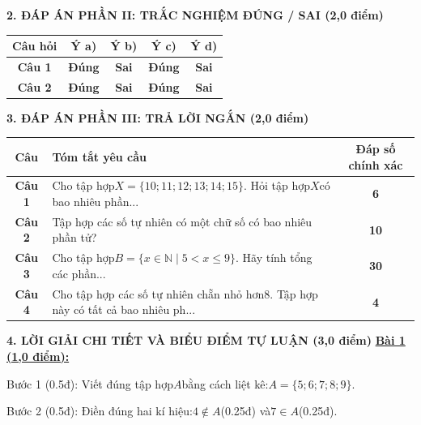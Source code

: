 \documentclass[11pt,a4paper]{article}
\begin{document}
\noindent\textbf{\large 2. ĐÁP ÁN PHẦN II: TRẮC NGHIỆM ĐÚNG / SAI (2,0 điểm)}
\vspace{4pt}
\begin{center}
\begin{tabular}{|c|c|c|c|c|}
\hline
\textbf{Câu hỏi} & \textbf{Ý a)} & \textbf{Ý b)} & \textbf{Ý c)} & \textbf{Ý d)} \\
\hline
\textbf{Câu 1} & \textbf{Đúng} & \textbf{Sai} & \textbf{Đúng} & \textbf{Sai} \\
\hline
\textbf{Câu 2} & \textbf{Đúng} & \textbf{Sai} & \textbf{Đúng} & \textbf{Sai} \\
\hline
\end{tabular}
\end{center}
\vspace{6pt}


\noindent\textbf{\large 3. ĐÁP ÁN PHẦN III: TRẢ LỜI NGẮN (2,0 điểm)}
\vspace{4pt}
\begin{center}
\begin{tabular}{|c|m{11cm}|c|}
\hline
\textbf{Câu} & \textbf{Tóm tắt yêu cầu} & \textbf{Đáp số chính xác} \\
\hline
\textbf{Câu 1} & Cho tập hợp$X = \{10; 11; 12; 13; 14; 15\}$. Hỏi tập hợp$X$có bao nhiêu phần... & \textbf{6} \\
\hline
\textbf{Câu 2} & Tập hợp các số tự nhiên có một chữ số có bao nhiêu phần tử? & \textbf{10} \\
\hline
\textbf{Câu 3} & Cho tập hợp$B = \{x \in \mathbb{N} \mid 5 < x \le 9\}$. Hãy tính tổng các phần... & \textbf{30} \\
\hline
\textbf{Câu 4} & Cho tập hợp các số tự nhiên chẵn nhỏ hơn$8$. Tập hợp này có tất cả bao nhiêu ph... & \textbf{4} \\
\hline
\end{tabular}
\end{center}
\vspace{6pt}


\noindent\textbf{\large 4. LỜI GIẢI CHI TIẾT VÀ BIỂU ĐIỂM TỰ LUẬN (3,0 điểm)}
\vspace{4pt}
\noindent\textbf{\underline{Bài 1 (1,0 điểm):}}\par\vspace{3pt}
Bước 1 (0.5đ): Viết đúng tập hợp$A$bằng cách liệt kê:$A = \{5; 6; 7; 8; 9\}$.\par\noindent Bước 2 (0.5đ): Điền đúng hai kí hiệu:$4 \notin A$(0.25đ) và$7 \in A$(0.25đ).\par\vspace{8pt}
\end{document}
